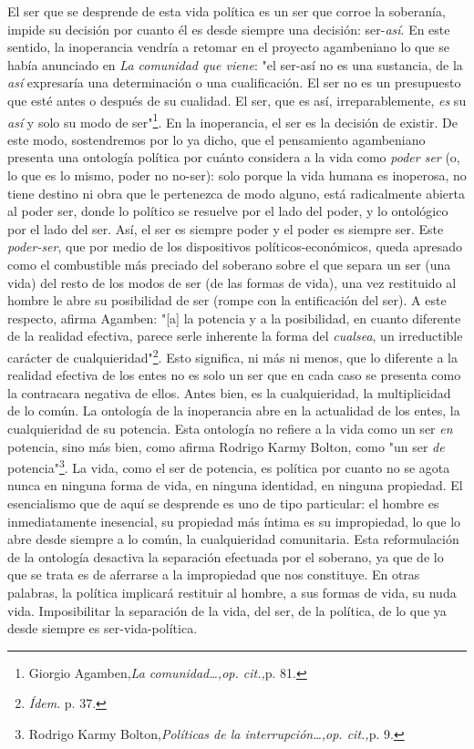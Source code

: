 \documentclass{book}
\begin{document}
El ser que se desprende de esta vida política es un ser que corroe la
soberanía, impide su decisión por cuanto él es desde siempre una
decisión: ser-\emph{así}. En este sentido, la inoperancia vendría a
retomar en el proyecto agambeniano lo que se había anunciado en \emph{La
comunidad que viene}: "el ser-así no es una sustancia, de la \emph{así}
expresaría una determinación o una cualificación. El ser no es un
presupuesto que esté antes o después de su cualidad. El ser, que es así,
irreparablemente, \emph{es} su \emph{así} y solo su modo de
ser"\footnote{Giorgio Agamben,\emph{La comunidad\ldots,op. cit.,}p. 81.}.
En la inoperancia, el ser es la decisión de existir. De este modo,
sostendremos por lo ya dicho, que el pensamiento agambeniano presenta
una ontología política por cuánto considera a la vida como \emph{poder
ser} (o, lo que es lo mismo, poder no no-ser): solo porque la vida
humana es inoperosa, no tiene destino ni obra que le pertenezca de modo
alguno, está radicalmente abierta al poder ser, donde lo político se
resuelve por el lado del poder, y lo ontológico por el lado del ser.
Así, el ser es siempre poder y el poder es siempre ser. Este
\emph{poder-ser}, que por medio de los dispositivos
políticos-económicos, queda apresado como el combustible más preciado
del soberano sobre el que separa un ser (una vida) del resto de los
modos de ser (de las formas de vida), una vez restituido al hombre le
abre su posibilidad de ser (rompe con la entificación del ser). A este
respecto, afirma Agamben: "{[}a{]} la potencia y a la posibilidad, en
cuanto diferente de la realidad efectiva, parece serle inherente la
forma del \emph{cualsea}, un irreductible carácter de
cualquieridad"\footnote{\emph{Ídem}. p. 37.}. Esto significa, ni más ni
menos, que lo diferente a la realidad efectiva de los entes no es solo
un ser que en cada caso se presenta como la contracara negativa de
ellos. Antes bien, es la cualquieridad, la multiplicidad de lo común. La
ontología de la inoperancia abre en la actualidad de los entes, la
cualquieridad de su potencia. Esta ontología no refiere a la vida como
un ser \emph{en} potencia, sino más bien, como afirma Rodrigo Karmy
Bolton, como "un ser \emph{de} potencia"\footnote{Rodrigo Karmy
  Bolton,\emph{Políticas de la interrupción\ldots,op. cit.,}p. 9.}. La
vida, como el ser de potencia, es política por cuanto no se agota nunca
en ninguna forma de vida, en ninguna identidad, en ninguna propiedad. El
esencialismo que de aquí se desprende es uno de tipo particular: el
hombre es inmediatamente inesencial, su propiedad más íntima es su
impropiedad, lo que lo abre desde siempre a lo común, la cualquieridad
comunitaria. Esta reformulación de la ontología desactiva la separación
efectuada por el soberano, ya que de lo que se trata es de aferrarse a
la impropiedad que nos constituye. En otras palabras, la política
implicará restituir al hombre, a sus formas de vida, su nuda vida.
Imposibilitar la separación de la vida, del ser, de la política, de lo
que ya desde siempre es ser-vida-política.
\end{document}
